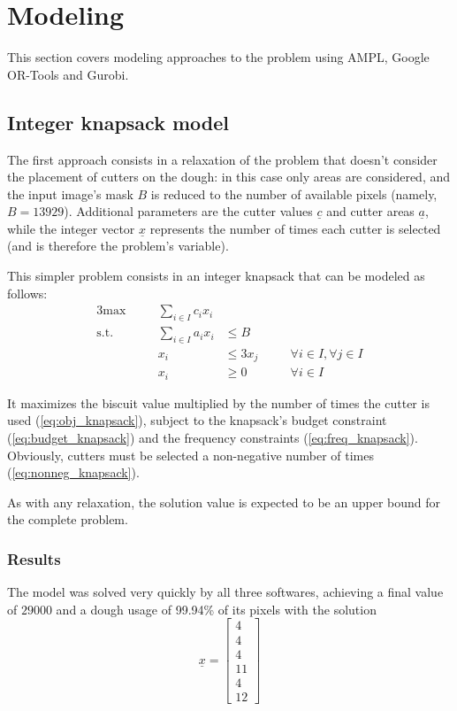 
\section{Modeling}
This section covers modeling approaches to the problem using AMPL, Google OR-Tools and Gurobi.

\subsection{Integer knapsack model}
The first approach consists in a relaxation of the problem that doesn't consider the placement of cutters on the dough: in this case only areas are considered, and the input image's mask $B$ is reduced to the number of available pixels (namely, $B = 13929$). Additional parameters are the cutter values $\underline{c}$ and cutter areas $\underline{a}$, while the integer vector $\underline{x}$ represents the number of times each cutter is selected (and is therefore the problem's variable).

This simpler problem consists in an integer knapsack that can be modeled as follows:
\begin{alignat}{3}
	\textrm{max}	&\quad& \sum_{i \in I}{c_i x_i}	& 				&& \label{eq:obj_knapsack} 		\\
	\textrm{s.t.}  	&\quad& \sum_{i \in I}{a_i x_i} & \leq B 		&& \label{eq:budget_knapsack} 	\\
					&\quad& x_i 					& \leq 3x_j		&& \quad \forall i \in I, \forall j \in I \label{eq:freq_knapsack} \\
					&\quad& x_i 					& \geq 0 		&& \quad \forall i \in I \label{eq:nonneg_knapsack} 
\end{alignat}

It maximizes the biscuit value multiplied by the number of times the cutter is used (\ref{eq:obj_knapsack}), subject to the knapsack's budget constraint (\ref{eq:budget_knapsack}) and the frequency constraints (\ref{eq:freq_knapsack}). Obviously, cutters must be selected a non-negative number of times (\ref{eq:nonneg_knapsack}).

As with any relaxation, the solution value is expected to be an upper bound for the complete problem.

\subsubsection{Results}
The model was solved very quickly by all three softwares, achieving a final value of $29000$ and a dough usage of 99.94\% of its pixels with the solution
$$
\underline{x} = 
\begin{bmatrix}
	4  \\
	4  \\
	4  \\
	11 \\
	4  \\
	12
\end{bmatrix}
$$

